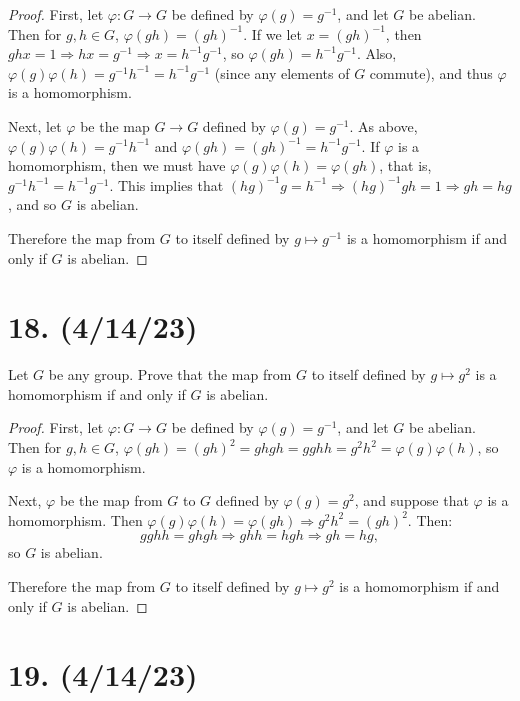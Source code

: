 \documentclass{article}
\begin{document}
\begin{proof}
    First, let $\varphi: G \rightarrow G$ be defined by $\varphi(g) = g^{-1}$, and let $G$ be abelian. Then for $g, h \in G$, $\varphi(gh) = (gh)^{-1}$. If we let $x = (gh)^{-1}$, then $ghx = 1 \Rightarrow hx = g^{-1} \Rightarrow x = h^{-1}g^{-1}$, so $\varphi(gh) = h^{-1}g^{-1}$. Also, $\varphi(g) \varphi(h) = g^{-1}h^{-1} = h^{-1}g^{-1}$ (since any elements of $G$ commute), and thus $\varphi$ is a homomorphism.

    Next, let $\varphi$ be the map $G \rightarrow G$ defined by $\varphi(g) = g^{-1}$. As above, $\varphi(g) \varphi(h) = g^{-1} h^{-1}$ and $\varphi(gh) = (gh)^{-1} = h^{-1}g^{-1}$. If $\varphi$ is a homomorphism, then we must have $\varphi(g) \varphi(h) = \varphi(gh)$, that is, $g^{-1} h^{-1} = h^{-1} g^{-1}$. This implies that $(hg)^{-1} g = h^{-1} \Rightarrow (hg)^{-1} gh = 1 \Rightarrow gh = hg$, and so $G$ is abelian.

    Therefore the map from $G$ to itself defined by $g \mapsto g^{-1}$ is a homomorphism if and only if $G$ is abelian.
\end{proof}

\section*{18. (4/14/23)}

Let $G$ be any group. Prove that the map from $G$ to itself defined by $g \mapsto g^2$ is a homomorphism if and only if $G$ is abelian.

\begin{proof}
    First, let $\varphi: G \rightarrow G$ be defined by $\varphi(g) = g^{-1}$, and let $G$ be abelian. Then for $g, h \in G$, $\varphi(gh) = (gh)^2 = ghgh = gghh = g^2 h^2 = \varphi(g) \varphi(h)$, so $\varphi$ is a homomorphism.

    Next, $\varphi$ be the map from $G$ to $G$ defined by $\varphi(g) = g^2$, and suppose that $\varphi$ is a homomorphism. Then $\varphi(g) \varphi(h) = \varphi(gh) \Rightarrow g^2 h^2 = (gh)^2$. Then:
    \begin{equation*}
        gghh = ghgh \Rightarrow ghh = hgh \Rightarrow gh = hg,
    \end{equation*}
    so $G$ is abelian.

    Therefore the map from $G$ to itself defined by $g \mapsto g^2$ is a homomorphism if and only if $G$ is abelian.
\end{proof}

\section*{19. (4/14/23)}
\end{document}
